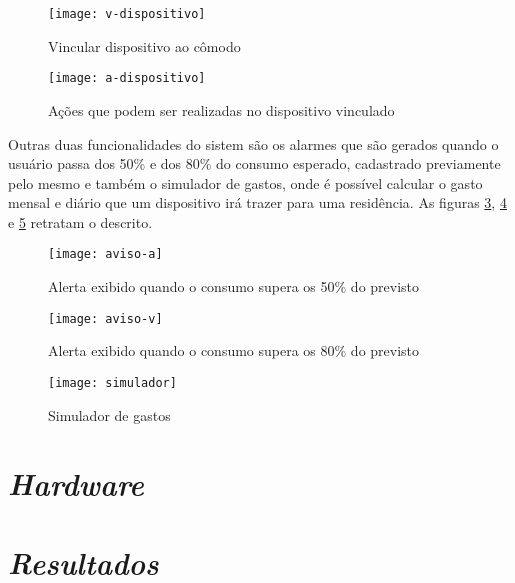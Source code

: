 \begin{figure}[h!]
	\texttt{[image: v-dispositivo]}
	\centering
	\caption[Vincular dispositivo ao cômodo]{Vincular dispositivo ao cômodo}
	\label{fig:v-dispositivo} 
\end{figure}
\FloatBarrier

\begin{figure}[h!]
	\texttt{[image: a-dispositivo]}
	\centering
	\caption[Ações que podem ser realizadas no dispositivo vinculado]{Ações que podem ser realizadas no dispositivo vinculado}
	\label{fig:a-dispositivo} 
\end{figure}
\FloatBarrier

Outras duas funcionalidades do sistem são os alarmes que são gerados quando o usuário passa dos 50\% e dos 80\% do consumo esperado, cadastrado previamente pelo mesmo e
também o simulador de gastos, onde é possível calcular o gasto mensal e diário que um dispositivo irá trazer para uma residência. As figuras
\ref{fig:aviso-a}, \ref{fig:aviso-v} e \ref{fig:simulador} retratam o descrito.

\begin{figure}[h!]
	\texttt{[image: aviso-a]}
	\centering
	\caption[Alerta exibido quando o consumo supera os 50\% do previsto]{Alerta exibido quando o consumo supera os 50\% do previsto}
	\label{fig:aviso-a} 
\end{figure}
\FloatBarrier

\begin{figure}[h!]
	\texttt{[image: aviso-v]}
	\centering
	\caption[Alerta exibido quando o consumo supera os 80\% do previsto]{Alerta exibido quando o consumo supera os 80\% do previsto}
	\label{fig:aviso-v} 
\end{figure}
\FloatBarrier

\begin{figure}[h!]
	\texttt{[image: simulador]}
	\centering
	\caption[Simulador de gastos]{Simulador de gastos}
	\label{fig:simulador} 
\end{figure}
\FloatBarrier

\section[\textit{Hardware}]{\textit{Hardware}}\label{hard-sec}
\section[\textit{Resultados}]{\textit{Resultados}}\label{resultados-sec}
